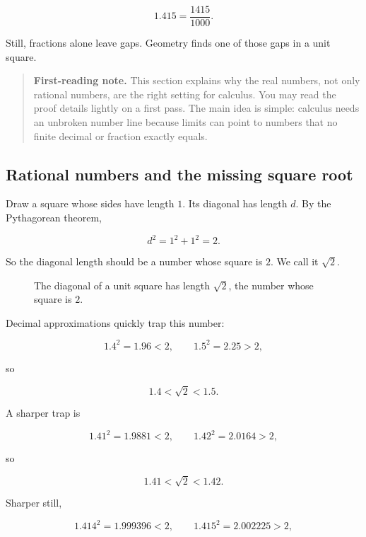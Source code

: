 \[
1.415=\frac{1415}{1000}.
\]

Still, fractions alone leave gaps. Geometry finds one of those gaps in a unit square.

\begin{quote}
\textbf{First-reading note.}
This section explains why the real numbers, not only rational numbers, are the right setting for calculus. You may read the proof details lightly on a first pass. The main idea is simple: calculus needs an unbroken number line because limits can point to numbers that no finite decimal or fraction exactly equals.
\end{quote}

\subsection{Rational numbers and the missing square root}
\label{subsec:rational-missing-sqrt}

Draw a square whose sides have length \(1\). Its diagonal has length \(d\). By the Pythagorean theorem,

\[
d^2=1^2+1^2=2.
\]

So the diagonal length should be a number whose square is \(2\). We call it \(\sqrt2\).

\begin{figure}[h]
\centering
{}
\caption{The diagonal of a unit square has length \(\sqrt2\), the number whose square is \(2\).}
\label{fig:unit-square-sqrt2}
\end{figure}

Decimal approximations quickly trap this number:

\[
1.4^2=1.96<2,
\qquad
1.5^2=2.25>2,
\]

so

\[
1.4<\sqrt2<1.5.
\]

A sharper trap is

\[
1.41^2=1.9881<2,
\qquad
1.42^2=2.0164>2,
\]

so

\[
1.41<\sqrt2<1.42.
\]

Sharper still,

\[
1.414^2=1.999396<2,
\qquad
1.415^2=2.002225>2,
\]

